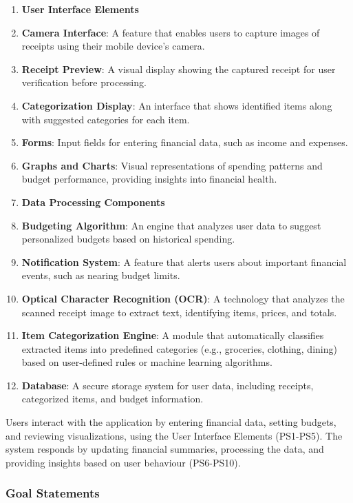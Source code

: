 \documentclass[12pt]{article}
\begin{document}
\noindent
\begin{enumerate}[label=PS\arabic*]
  \item[] \textbf{User Interface Elements}
  \item \textbf{Camera Interface}: A feature that enables users to capture
  images of receipts using their mobile device’s camera.
  \item \textbf{Receipt Preview}: A visual display showing the captured
  receipt for user verification before processing.
  \item \textbf{Categorization Display}: An interface that shows identified
  items along with suggested categories for each item.
  \item \textbf{Forms}: Input fields for entering financial data, such as
  income and expenses.
  \item \textbf{Graphs and Charts}: Visual representations of spending
  patterns and budget performance, providing insights into financial health.

  \item[] \textbf{Data Processing Components}
  \item \textbf{Budgeting Algorithm}: An engine that analyzes user data to
  suggest personalized budgets based on historical spending.
  \item \textbf{Notification System}: A feature that alerts users about
  important financial events, such as nearing budget limits.
  \item \textbf{Optical Character Recognition (OCR)}: A technology that
  analyzes the scanned receipt image to extract text, identifying items, prices,
  and totals.
  \item \textbf{Item Categorization Engine}: A module that automatically
  classifies extracted items into predefined categories (e.g., groceries,
  clothing, dining) based on user-defined rules or machine learning algorithms.
  \item \textbf{Database}: A secure storage system for user data, including
  receipts, categorized items, and budget information.
\end{enumerate}

Users interact with the application by entering financial data, setting budgets,
  and reviewing visualizations, using the User Interface Elements (PS1-PS5).
  The system responds by updating financial summaries, processing the
  data, and providing insights based on user behaviour (PS6-PS10).



\subsubsection{Goal Statements}
\end{document}
